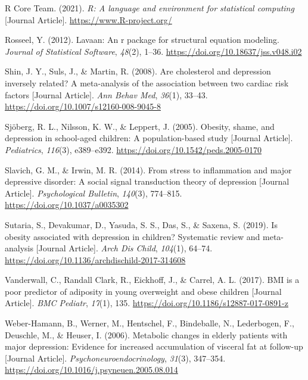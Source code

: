 \documentclass[
  letterpaper,
  DIV=11,
  numbers=noendperiod]{scrreport}
\newlength{\cslhangindent}
\newenvironment{CSLReferences}[2] %
 {\begin{list}{}{%
  \setlength{\itemindent}{0pt}
  \setlength{\leftmargin}{0pt}
  \setlength{\parsep}{0pt}
  \ifodd #1
   \setlength{\leftmargin}{\cslhangindent}
   \setlength{\itemindent}{-1\cslhangindent}
  \fi
  \setlength{\itemsep}{#2\baselineskip}}}
 {\end{list}}
\begin{document}
\begin{CSLReferences}{1}{0}
R Core Team. (2021). \emph{R: A language and environment for statistical
computing} {[}Journal Article{]}. \url{https://www.R-project.org/}

Rosseel, Y. (2012). Lavaan: An r package for structural equation
modeling. \emph{Journal of Statistical Software}, \emph{48}(2), 1--36.
\url{https://doi.org/10.18637/jss.v048.i02}

Shin, J. Y., Suls, J., \& Martin, R. (2008). Are cholesterol and
depression inversely related? A meta-analysis of the association between
two cardiac risk factors {[}Journal Article{]}. \emph{Ann Behav Med},
\emph{36}(1), 33--43. \url{https://doi.org/10.1007/s12160-008-9045-8}

Sjöberg, R. L., Nilsson, K. W., \& Leppert, J. (2005). Obesity, shame,
and depression in school-aged children: A population-based study
{[}Journal Article{]}. \emph{Pediatrics}, \emph{116}(3), e389--e392.
\url{https://doi.org/10.1542/peds.2005-0170}

Slavich, G. M., \& Irwin, M. R. (2014). From stress to inflammation and
major depressive disorder: A social signal transduction theory of
depression {[}Journal Article{]}. \emph{Psychological Bulletin},
\emph{140}(3), 774--815. \url{https://doi.org/10.1037/a0035302}

Sutaria, S., Devakumar, D., Yasuda, S. S., Das, S., \& Saxena, S.
(2019). Is obesity associated with depression in children? Systematic
review and meta-analysis {[}Journal Article{]}. \emph{Arch Dis Child},
\emph{104}(1), 64--74.
\url{https://doi.org/10.1136/archdischild-2017-314608}

Vanderwall, C., Randall Clark, R., Eickhoff, J., \& Carrel, A. L.
(2017). BMI is a poor predictor of adiposity in young overweight and
obese children {[}Journal Article{]}. \emph{BMC Pediatr}, \emph{17}(1),
135. \url{https://doi.org/10.1186/s12887-017-0891-z}

Weber-Hamann, B., Werner, M., Hentschel, F., Bindeballe, N., Lederbogen,
F., Deuschle, M., \& Heuser, I. (2006). Metabolic changes in elderly
patients with major depression: Evidence for increased accumulation of
visceral fat at follow-up {[}Journal Article{]}.
\emph{Psychoneuroendocrinology}, \emph{31}(3), 347--354.
\url{https://doi.org/10.1016/j.psyneuen.2005.08.014}


\end{CSLReferences}
\end{document}
